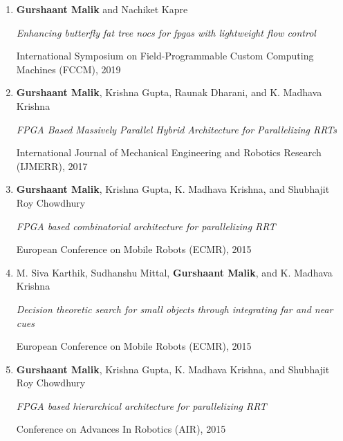 \begin{enumerate}
	\item \textbf{Gurshaant Malik} and Nachiket Kapre
	
	\textit{Enhancing butterfly fat tree nocs for fpgas with lightweight flow control}
	
	International Symposium on Field-Programmable Custom Computing Machines (FCCM), 2019
	
	\item \textbf{Gurshaant Malik}, Krishna Gupta, Raunak Dharani, and K. Madhava Krishna
	
	\textit{FPGA Based Massively Parallel Hybrid Architecture for Parallelizing RRTs}
	
	International Journal of Mechanical Engineering and Robotics Research (IJMERR), 2017
	
	\item \textbf{Gurshaant Malik}, Krishna Gupta, K. Madhava Krishna, and Shubhajit Roy Chowdhury
	
	\textit{FPGA based combinatorial architecture for parallelizing RRT}
	
	European Conference on Mobile Robots (ECMR), 2015
	
    \item M. Siva Karthik, Sudhanshu Mittal, \textbf{Gurshaant Malik}, and K. Madhava Krishna
    
    \textit{Decision theoretic search for small objects through integrating far and near cues}
    
    European Conference on Mobile Robots (ECMR), 2015
    
    \item \textbf{Gurshaant Malik}, Krishna Gupta, K. Madhava Krishna, and Shubhajit Roy Chowdhury
    
    \textit{FPGA based hierarchical architecture for parallelizing RRT}
    
    Conference on Advances In Robotics (AIR), 2015
    
	\setcounter{publicationCounter}{\value{enumi}}	
\end{enumerate}

